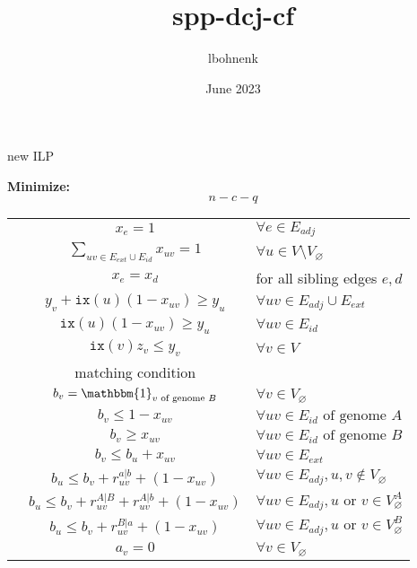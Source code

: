 \documentclass{article}[7pt]
\title{spp-dcj-cf}
\author{lbohnenk }
\date{June 2023}
\begin{document}
\newcommand{\extremityedges}{E_{ext}}
\newcommand{\adjacencyedges}{E_{adj}}
\newcommand{\indeledges}{E_{id}}
\newcommand{\idx}[1]{\texttt{ix}(#1)}
\newcommand{\parityvar}{b}
\newcommand{\caps}{V_{\varnothing}}
\newcommand{\trans}{|}
\newcommand{\cis}{\circ}
\newcommand{\coolone}{\mathbbm{1}}

\begin{algorithm}[htb]
\caption{new ILP}
\textbf{Minimize:}
\begin{equation*}
    n - c -q
\end{equation*}

\begin{constraints}

\begin{tabular}{lcl}
    \cns & $x_{e} = 1 $ & $\forall e\in \adjacencyedges$\\
     \cns & $\sum_{uv\in E_{ext} \cup E_{id} } x_{uv}= 1$ & $\forall u\in V\setminus V_{\varnothing}$  \\
     \cns & $x_e=x_d$ & for all sibling edges $e,d$\\
     \cns & $y_v + \idx{u}(1-x_{uv}) \geq y_u$ &$\forall uv \in \adjacencyedges\cup \extremityedges$\\
          & $\idx{u}(1-x_{uv})\geq y_u$& $\forall uv \in \indeledges$\\
    \cns & $\idx{v}z_v \leq y_v$ & $\forall v\in V $\\
    \cns & matching condition\\
    \cns & $\parityvar_v = \coolone_{v \text{ of genome } B}$ & $\forall v \in \caps$\\
    \cns & $\parityvar_v \leq 1 - x_{uv}$ & $\forall uv \in \indeledges \text{ of genome } A$\\
     & $\parityvar_v \geq  x_{uv}$ & $\forall uv \in \indeledges \text{ of genome } B$\\
    \cns & $\parityvar_v \leq \parityvar_u +  x_{uv}$& $\forall uv \in \extremityedges$\\
    & $\parityvar_u \leq \parityvar_v + r_{uv}^{a\trans b} + (1-x_{uv})$& $\forall uv\in E_{adj},u,v\notin \caps$\\
    & $\parityvar_u \leq \parityvar_v + r_{uv}^{A\trans B} + r_{uv}^{A\trans b} + (1-x_{uv})$& $\forall uv\in E_{adj}, u \text{ or } v\in \caps^A$\\
    & $\parityvar_u \leq \parityvar_v + r_{uv}^{B\trans a} + (1-x_{uv})$& $\forall uv\in E_{adj}, u \text{ or } v\in \caps^B$\\
    \cns & $a_v = 0$ & $\forall v\in V_{\varnothing}$\\

\end{tabular}
\end{constraints}
\end{algorithm}
\end{document}
